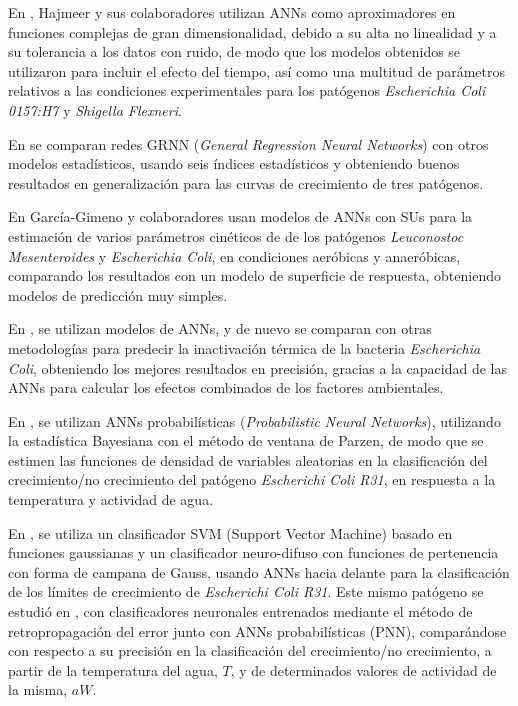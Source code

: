 En \cite{Hajmeer2000}, Hajmeer y sus colaboradores
utilizan ANNs como aproximadores en funciones complejas de gran dimensionalidad, debido a
su alta no linealidad y a su tolerancia a los datos con ruido, de modo que los modelos
obtenidos se utilizaron para incluir el efecto del tiempo, así como una multitud de
parámetros relativos a las condiciones experimentales para los patógenos
\textit{Escherichia Coli 0157:H7} y \textit{Shigella Flexneri}.

En \cite{Jeyamkondan2001}
se comparan redes GRNN (\textit{General Regression Neural Networks}) con otros modelos
estadísticos, usando seis índices estadísticos y obteniendo buenos resultados en
generalización para las curvas de crecimiento de tres patógenos.

En \cite{Garcia2003,Garcia2005} García-Gimeno y colaboradores usan
modelos de ANNs con SUs para la estimación de varios parámetros cinéticos de
de los patógenos \textit{Leuconostoc Mesenteroides} y \textit{Escherichia Coli}, en
condiciones aeróbicas y anaeróbicas, comparando los resultados con un modelo de superficie
de respuesta, obteniendo modelos de predicción muy simples.

En \cite{Lou2001}, se
utilizan modelos de ANNs, y de nuevo se comparan con otras metodologías para predecir la
inactivación térmica de la bacteria \textit{Escherichia Coli}, obteniendo los mejores
resultados en precisión, gracias a la capacidad de las ANNs para calcular los efectos
combinados de los factores ambientales.

En \cite{Hajmeer2002}, se utilizan ANNs probabilísticas (\textit{Probabilistic
Neural Networks}), utilizando la estadística Bayesiana con el método de ventana de Parzen, de modo
que
se estimen las funciones de densidad de variables aleatorias en
la clasificación del crecimiento/no crecimiento del patógeno \textit{Escherichi Coli R31}, en
respuesta a la temperatura y actividad de agua.

En \cite{ElSebakhy2007,ElSebakhy2007b}, se utiliza un clasificador SVM (Support
Vector Machine) basado en funciones gaussianas  y un clasificador
neuro-difuso con funciones de pertenencia con forma de campana de Gauss, usando ANNs hacia delante
para la clasificación de los límites de crecimiento de \textit{Escherichi Coli R31}. Este mismo
patógeno se estudió en \cite{Hajmeer2003}, con clasificadores neuronales entrenados mediante el
método de retropropagación del error junto con ANNs probabilísticas (PNN), comparándose con
respecto a su precisión en la clasificación del crecimiento/no crecimiento, a partir de la
temperatura del agua, $T$, y de determinados valores de actividad de la misma, $aW$.

